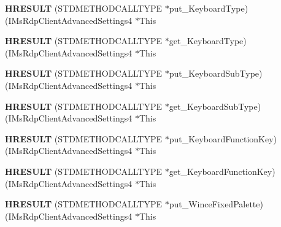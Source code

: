 \begin{DoxyCompactItemize}
{\bfseries H\+R\+E\+S\+U\+LT} (S\+T\+D\+M\+E\+T\+H\+O\+D\+C\+A\+L\+L\+T\+Y\+PE $\ast$put\+\_\+\+Keyboard\+Type)(I\+Ms\+Rdp\+Client\+Advanced\+Settings4 $\ast$This
\item 
\mbox{\label{struct_i_ms_rdp_client_advanced_settings4_vtbl_ab0a7e3cbcfff309bac1ddb24e8396f1f}} 
{\bfseries H\+R\+E\+S\+U\+LT} (S\+T\+D\+M\+E\+T\+H\+O\+D\+C\+A\+L\+L\+T\+Y\+PE $\ast$get\+\_\+\+Keyboard\+Type)(I\+Ms\+Rdp\+Client\+Advanced\+Settings4 $\ast$This
\item 
\mbox{\label{struct_i_ms_rdp_client_advanced_settings4_vtbl_a346cc547b35e16ea611b2c30edcac276}} 
{\bfseries H\+R\+E\+S\+U\+LT} (S\+T\+D\+M\+E\+T\+H\+O\+D\+C\+A\+L\+L\+T\+Y\+PE $\ast$put\+\_\+\+Keyboard\+Sub\+Type)(I\+Ms\+Rdp\+Client\+Advanced\+Settings4 $\ast$This
\item 
\mbox{\label{struct_i_ms_rdp_client_advanced_settings4_vtbl_ab1fdeca4cc878bae88e626308d4f138d}} 
{\bfseries H\+R\+E\+S\+U\+LT} (S\+T\+D\+M\+E\+T\+H\+O\+D\+C\+A\+L\+L\+T\+Y\+PE $\ast$get\+\_\+\+Keyboard\+Sub\+Type)(I\+Ms\+Rdp\+Client\+Advanced\+Settings4 $\ast$This
\item 
\mbox{\label{struct_i_ms_rdp_client_advanced_settings4_vtbl_a9e28bcb93d8480bfffcc9affdd1f8083}} 
{\bfseries H\+R\+E\+S\+U\+LT} (S\+T\+D\+M\+E\+T\+H\+O\+D\+C\+A\+L\+L\+T\+Y\+PE $\ast$put\+\_\+\+Keyboard\+Function\+Key)(I\+Ms\+Rdp\+Client\+Advanced\+Settings4 $\ast$This
\item 
\mbox{\label{struct_i_ms_rdp_client_advanced_settings4_vtbl_a611090c4d790b93827117c46441a001c}} 
{\bfseries H\+R\+E\+S\+U\+LT} (S\+T\+D\+M\+E\+T\+H\+O\+D\+C\+A\+L\+L\+T\+Y\+PE $\ast$get\+\_\+\+Keyboard\+Function\+Key)(I\+Ms\+Rdp\+Client\+Advanced\+Settings4 $\ast$This
\item 
\mbox{\label{struct_i_ms_rdp_client_advanced_settings4_vtbl_ad26b5a7915d5750171e317c08ed68587}} 
{\bfseries H\+R\+E\+S\+U\+LT} (S\+T\+D\+M\+E\+T\+H\+O\+D\+C\+A\+L\+L\+T\+Y\+PE $\ast$put\+\_\+\+Wince\+Fixed\+Palette)(I\+Ms\+Rdp\+Client\+Advanced\+Settings4 $\ast$This

\end{DoxyCompactItemize}
